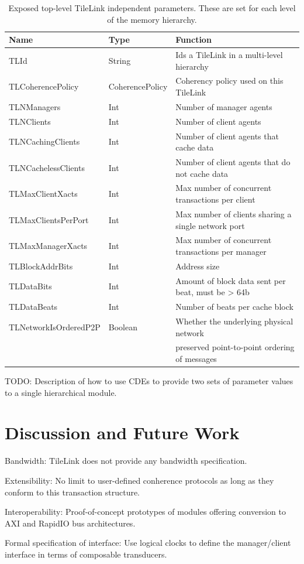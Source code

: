 \begin{table}[ht]
\begin{center}
\begin{tabular}{|l|l|l|}
    \hline
Name & Type & Function \\ \hline \hline
TLId & String & Ids a TileLink in a multi-level hierarchy \\ \hline
TLCoherencePolicy & CoherencePolicy & Coherency policy used on this TileLink \\ \hline
TLNManagers & Int & Number of manager agents \\ \hline
TLNClients & Int & Number of client agents \\ \hline
TLNCachingClients & Int & Number of client agents that cache data \\ \hline
TLNCachelessClients & Int & Number of client agents that do not cache data \\ \hline
TLMaxClientXacts & Int & Max number of concurrent transactions per client \\ \hline
TLMaxClientsPerPort & Int & Max number of clients sharing a single network port \\ \hline
TLMaxManagerXacts & Int & Max number of concurrent transactions per manager \\ \hline
TLBlockAddrBits & Int & Address size \\ \hline
TLDataBits & Int & Amount of block data sent per beat, must be > 64b \\ \hline
TLDataBeats & Int & Number of beats per cache block \\ \hline
TLNetworkIsOrderedP2P & Boolean & Whether the underlying physical network \\
                      &         & preserved point-to-point ordering of messages \\ \hline
\end{tabular}
\end{center}
\caption{Exposed top-level TileLink independent parameters. These are set for each level of the memory hierarchy.}
\label{tab:tlparams}
\end{table}

TODO: Description of how to use CDEs to provide two sets of parameter values to a single hierarchical module.

\section{Discussion and Future Work}

Bandwidth: TileLink does not provide any bandwidth specification. 

Extensibility: No limit to user-defined conherence protocols as long as they conform to this transaction structure.

Interoperability: Proof-of-concept prototypes of modules offering conversion to AXI and RapidIO bus architectures.

Formal specification of interface: Use logical clocks to define the manager/client interface in terms of composable transducers.


